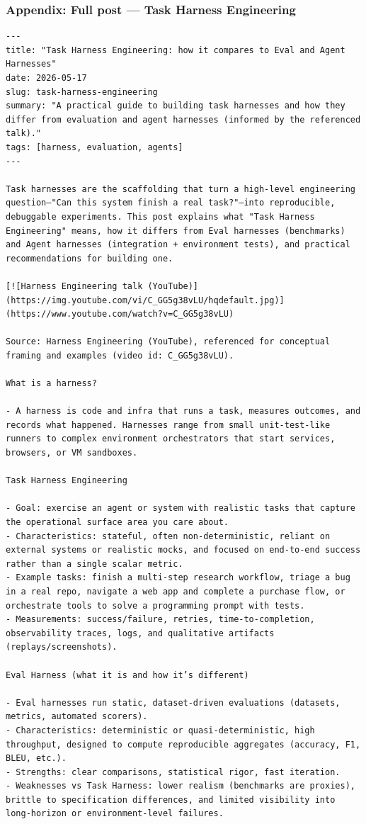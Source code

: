 \documentclass[aspectratio=169]{beamer}
\begin{document}
\begin{frame}[fragile]
\frametitle{Appendix: Full post — Task Harness Engineering}
\begin{verbatim}
---
title: "Task Harness Engineering: how it compares to Eval and Agent Harnesses"
date: 2026-05-17
slug: task-harness-engineering
summary: "A practical guide to building task harnesses and how they differ from evaluation and agent harnesses (informed by the referenced talk)."
tags: [harness, evaluation, agents]
---

Task harnesses are the scaffolding that turn a high-level engineering question—"Can this system finish a real task?"—into reproducible, debuggable experiments. This post explains what "Task Harness Engineering" means, how it differs from Eval harnesses (benchmarks) and Agent harnesses (integration + environment tests), and practical recommendations for building one.

[![Harness Engineering talk (YouTube)](https://img.youtube.com/vi/C_GG5g38vLU/hqdefault.jpg)](https://www.youtube.com/watch?v=C_GG5g38vLU)

Source: Harness Engineering (YouTube), referenced for conceptual framing and examples (video id: C_GG5g38vLU).

What is a harness?

- A harness is code and infra that runs a task, measures outcomes, and records what happened. Harnesses range from small unit-test-like runners to complex environment orchestrators that start services, browsers, or VM sandboxes.

Task Harness Engineering

- Goal: exercise an agent or system with realistic tasks that capture the operational surface area you care about.
- Characteristics: stateful, often non-deterministic, reliant on external systems or realistic mocks, and focused on end-to-end success rather than a single scalar metric.
- Example tasks: finish a multi-step research workflow, triage a bug in a real repo, navigate a web app and complete a purchase flow, or orchestrate tools to solve a programming prompt with tests.
- Measurements: success/failure, retries, time-to-completion, observability traces, logs, and qualitative artifacts (replays/screenshots).

Eval Harness (what it is and how it’s different)

- Eval harnesses run static, dataset-driven evaluations (datasets, metrics, automated scorers).
- Characteristics: deterministic or quasi-deterministic, high throughput, designed to compute reproducible aggregates (accuracy, F1, BLEU, etc.).
- Strengths: clear comparisons, statistical rigor, fast iteration.
- Weaknesses vs Task Harness: lower realism (benchmarks are proxies), brittle to specification differences, and limited visibility into long-horizon or environment-level failures.


\end{verbatim}
\end{frame}
\end{document}
